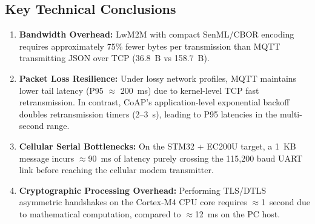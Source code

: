 \documentclass[11pt,a4paper]{article}
\begin{document}
\subsection{Key Technical Conclusions}
\begin{enumerate}
  \item \textbf{Bandwidth Overhead:} LwM2M with compact SenML/CBOR encoding requires approximately 75\% fewer bytes per transmission than MQTT transmitting JSON over TCP (36.8~B vs 158.7~B).
  \item \textbf{Packet Loss Resilience:} Under lossy network profiles, MQTT maintains lower tail latency (P95 $\approx$ 200~ms) due to kernel-level TCP fast retransmission. In contrast, CoAP's application-level exponential backoff doubles retransmission timers (2--3~s), leading to P95 latencies in the multi-second range.
  \item \textbf{Cellular Serial Bottlenecks:} On the STM32 + EC200U target, a 1~KB message incurs $\approx$90~ms of latency purely crossing the 115,200 baud UART link before reaching the cellular modem transmitter.
  \item \textbf{Cryptographic Processing Overhead:} Performing TLS/DTLS asymmetric handshakes on the Cortex-M4 CPU core requires $\approx$1~second due to mathematical computation, compared to $\approx$12~ms on the PC host.
\end{enumerate}
\end{document}
